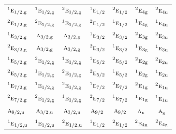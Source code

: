 \documentclass[10pt,a4paper]{article}
\numberwithin{equation}{section}
\newcommand{\irr}[1]{\text{\normalfont\scshape #1}}
\newcommand{\conjpair}[1]{{}^{#1}}
\newcommand{\ptag}[1]{\mathrm{#1}}
\begin{document}
{\begin{longtable}{@{}lcccccc@{}}
$\conjpair{1}\irr{e}_{1/2,\ptag{g}}$ & $\conjpair{1}\irr{e}_{1/2,\ptag{g}}$ & $\conjpair{2}\irr{e}_{1/2,\ptag{g}}$ & $\conjpair{1}\irr{e}_{1/2}$ & $\conjpair{2}\irr{e}_{1/2}$ & $\conjpair{2}\irr{e}_{4\ptag{g}}$ & $\conjpair{2}\irr{e}_{4\ptag{u}}$\\
$\conjpair{2}\irr{e}_{1/2,\ptag{g}}$ & $\conjpair{2}\irr{e}_{1/2,\ptag{g}}$ & $\conjpair{1}\irr{e}_{1/2,\ptag{g}}$ & $\conjpair{2}\irr{e}_{1/2}$ & $\conjpair{1}\irr{e}_{1/2}$ & $\conjpair{1}\irr{e}_{4\ptag{g}}$ & $\conjpair{1}\irr{e}_{4\ptag{u}}$\\
$\conjpair{1}\irr{e}_{3/2,\ptag{g}}$ & $\irr{a}_{3/2,\ptag{g}}$ & $\irr{a}_{3/2,\ptag{g}}$ & $\conjpair{1}\irr{e}_{3/2}$ & $\conjpair{2}\irr{e}_{3/2}$ & $\conjpair{2}\irr{e}_{3\ptag{g}}$ & $\conjpair{2}\irr{e}_{3\ptag{u}}$\\
$\conjpair{2}\irr{e}_{3/2,\ptag{g}}$ & $\irr{a}_{3/2,\ptag{g}}$ & $\irr{a}_{3/2,\ptag{g}}$ & $\conjpair{2}\irr{e}_{3/2}$ & $\conjpair{1}\irr{e}_{3/2}$ & $\conjpair{1}\irr{e}_{3\ptag{g}}$ & $\conjpair{1}\irr{e}_{3\ptag{u}}$\\
$\conjpair{1}\irr{e}_{5/2,\ptag{g}}$ & $\conjpair{2}\irr{e}_{1/2,\ptag{g}}$ & $\conjpair{1}\irr{e}_{1/2,\ptag{g}}$ & $\conjpair{1}\irr{e}_{5/2}$ & $\conjpair{2}\irr{e}_{5/2}$ & $\conjpair{2}\irr{e}_{2\ptag{g}}$ & $\conjpair{2}\irr{e}_{2\ptag{u}}$\\
$\conjpair{2}\irr{e}_{5/2,\ptag{g}}$ & $\conjpair{1}\irr{e}_{1/2,\ptag{g}}$ & $\conjpair{2}\irr{e}_{1/2,\ptag{g}}$ & $\conjpair{2}\irr{e}_{5/2}$ & $\conjpair{1}\irr{e}_{5/2}$ & $\conjpair{1}\irr{e}_{2\ptag{g}}$ & $\conjpair{1}\irr{e}_{2\ptag{u}}$\\
$\conjpair{1}\irr{e}_{7/2,\ptag{g}}$ & $\conjpair{1}\irr{e}_{1/2,\ptag{g}}$ & $\conjpair{2}\irr{e}_{1/2,\ptag{g}}$ & $\conjpair{1}\irr{e}_{7/2}$ & $\conjpair{2}\irr{e}_{7/2}$ & $\conjpair{2}\irr{e}_{1\ptag{g}}$ & $\conjpair{2}\irr{e}_{1\ptag{u}}$\\
$\conjpair{2}\irr{e}_{7/2,\ptag{g}}$ & $\conjpair{2}\irr{e}_{1/2,\ptag{g}}$ & $\conjpair{1}\irr{e}_{1/2,\ptag{g}}$ & $\conjpair{2}\irr{e}_{7/2}$ & $\conjpair{1}\irr{e}_{7/2}$ & $\conjpair{1}\irr{e}_{1\ptag{g}}$ & $\conjpair{1}\irr{e}_{1\ptag{u}}$\\
$\irr{a}_{9/2,\ptag{u}}$ & $\irr{a}_{3/2,\ptag{u}}$ & $\irr{a}_{3/2,\ptag{u}}$ & $\irr{a}_{9/2}$ & $\irr{a}_{9/2}$ & $\irr{a}_{\ptag{u}}$ & $\irr{a}_{\ptag{g}}$\\
$\conjpair{1}\irr{e}_{1/2,\ptag{u}}$ & $\conjpair{1}\irr{e}_{1/2,\ptag{u}}$ & $\conjpair{2}\irr{e}_{1/2,\ptag{u}}$ & $\conjpair{1}\irr{e}_{1/2}$ & $\conjpair{2}\irr{e}_{1/2}$ & $\conjpair{2}\irr{e}_{4\ptag{u}}$ & $\conjpair{2}\irr{e}_{4\ptag{g}}$\\

\end{longtable}}
\end{document}
